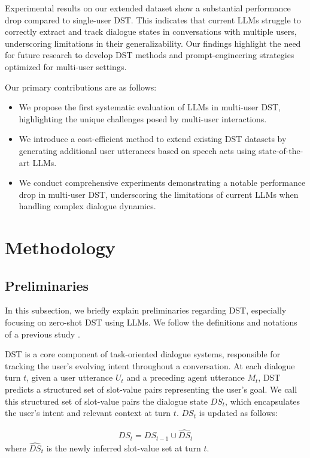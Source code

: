 \documentclass[11pt]{article}
\begin{document}
Experimental results on our extended dataset show a substantial performance drop compared to single-user DST. This indicates that current LLMs struggle to correctly extract and track dialogue states in conversations with multiple users, underscoring limitations in their generalizability. Our findings highlight the need for future research to develop DST methods and prompt-engineering strategies optimized for multi-user settings.

Our primary contributions are as follows:
\begin{itemize}
    \item We propose the first systematic evaluation of LLMs in multi-user DST, highlighting the unique challenges posed by multi-user interactions.
    \item We introduce a cost-efficient method to extend existing DST datasets by generating additional user utterances based on speech acts using state-of-the-art LLMs.
    \item We conduct comprehensive experiments demonstrating a notable performance drop in multi-user DST, underscoring the limitations of current LLMs when handling complex dialogue dynamics.
\end{itemize}

\section{Methodology}
\label{sec:method}
\subsection{Preliminaries}
\label{sec:method-preliminary}

In this subsection, we briefly explain preliminaries regarding DST, especially focusing on zero-shot DST using LLMs. We follow the definitions and notations of a previous study \cite{heck2023chatgpt}.

DST is a core component of task-oriented dialogue systems, responsible for tracking the user’s evolving intent throughout a conversation. At each dialogue turn $t$, given a user utterance $U_t$ and a preceding agent utterance $M_t$, DST predicts a structured set of slot-value pairs representing the user’s goal. We call this structured set of slot-value pairs the dialogue state $\textit{DS}_t$, which encapsulates the user’s intent and relevant context at turn $t$. $\textit{DS}_t$ is updated as follows:

\begin{gather*}
\textit{DS}_t = \textit{DS}_{t-1} \cup \widehat{\textit{DS}}_t
\end{gather*}
where $\widehat{\textit{DS}}_t$ is the newly inferred slot-value set at turn $t$.
\end{document}
